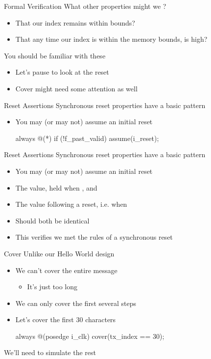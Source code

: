 \documentclass[style=gt,mode=present,paper=screen]{powerdot}
\begin{document}
%
%
\begin{slide}[bm=,toc=,method=file]{Formal Verification}
What other properties might we ?
\begin{itemize}
\item That our index remains within bounds?
\item That any time our index is within the memory bounds,  is high?
\end{itemize}
You should be familiar with these
\begin{itemize}
\item Let's pause to look at the reset
\item Cover might need some attention as well
\end{itemize}
\end{slide}
%
%
\begin{slide}[method=direct]{Reset Assertions}
Synchronous reset properties have a basic pattern
\begin{itemize}
\item You may (or may not) assume an initial reset
\begin{zformal}
always @(*)
if (!f_past_valid)
	assume(i_reset);
\end{zformal}
\end{itemize}
\end{slide}
%
%
\begin{slide}[toc=,bm=,method=direct]{Reset Assertions}
Synchronous reset properties have a basic pattern
\begin{itemize}
\item You may (or may not) assume an initial reset
\item The  value, held when , and
\item[] The value following a reset, i.e. when 
\item[] Should both be identical
\item This verifies we met the rules of a synchronous reset
\end{itemize}
\end{slide}
%
%
\begin{slide}[method=file]{Cover}
Unlike our Hello World design
\begin{itemize}
\item We can't cover the entire message
\begin{itemize}
\item It's just too long
\end{itemize}
\item We can only cover the first several steps
\item Let's cover the first 30 characters
\begin{zformal}
always @(posedge i_clk)
	cover(tx_index == 30);
\end{zformal}
\end{itemize}
We'll need to simulate the rest
\end{slide}
\end{document}
